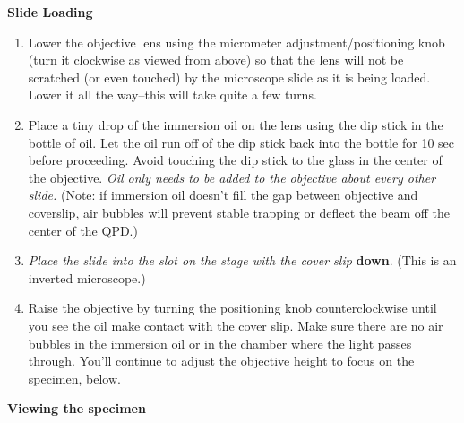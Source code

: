 \documentclass{../lab}
\begin{document}
\textbf{Slide Loading}

\begin{enumerate}
    \item Lower the objective lens using the micrometer adjustment/positioning knob (turn it clockwise as viewed from above) so that the lens will not be scratched (or even touched) by the microscope slide as it is being loaded. Lower it all the way--this will take quite a few turns.

    \item Place a tiny drop of the immersion oil on the lens using the dip stick in the bottle of oil. Let the oil run off of the dip stick back into the bottle for 10 sec before proceeding. Avoid touching the dip stick to the glass in the center of the objective. \emph{Oil only needs to be added to the objective about every other slide.} (Note: if immersion oil doesn't fill the gap between objective and coverslip, air bubbles will prevent stable trapping or deflect the beam off the center of the QPD.)

    \item \emph{Place the slide into the slot on the stage with the cover slip} \textbf{down}. (This is an inverted microscope.)

    \item Raise the objective by turning the positioning knob counterclockwise until you see the oil make contact with the cover slip. Make sure there are no air bubbles in the immersion oil or in the chamber where the light passes through. You'll continue to adjust the objective height to focus on the specimen, below.

\end{enumerate}

\textbf{Viewing the specimen}
\end{document}
